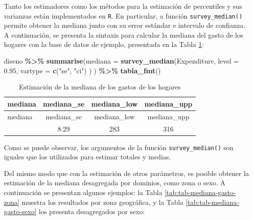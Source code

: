 \documentclass[
  spanish,
  12pt,
]{book}
\newenvironment{Shaded}{\begin{snugshade}}{\end{snugshade}}
\newcommand{\AttributeTok}[1]{\textcolor[rgb]{0.13,0.29,0.53}{#1}}
\newcommand{\FloatTok}[1]{\textcolor[rgb]{0.00,0.00,0.81}{#1}}
\newcommand{\FunctionTok}[1]{\textcolor[rgb]{0.13,0.29,0.53}{\textbf{#1}}}
\newcommand{\NormalTok}[1]{#1}
\newcommand{\SpecialCharTok}[1]{\textcolor[rgb]{0.81,0.36,0.00}{\textbf{#1}}}
\newcommand{\StringTok}[1]{\textcolor[rgb]{0.31,0.60,0.02}{#1}}
\begin{document}
Tanto los estimadores como los métodos para la estimación de percentiles y sus varianzas están implementados en \texttt{R}. En particular, a función \texttt{survey\_median()} permite obtener la mediana junto con su error estándar e intervalo de confianza. A continuación, se presenta la sintaxis para calcular la mediana del gasto de los hogares con la base de datos de ejemplo, presentada en la Tabla \ref{tab:tab-mediana-gasto}:

\begin{Shaded}
\begin{Highlighting}[]
\NormalTok{diseno }\SpecialCharTok{\%\textgreater{}\%} 
  \FunctionTok{summarise}\NormalTok{(}\AttributeTok{mediana =} \FunctionTok{survey\_median}\NormalTok{(Expenditure,}
                                    \AttributeTok{level =} \FloatTok{0.95}\NormalTok{,}
                                    \AttributeTok{vartype =}  \FunctionTok{c}\NormalTok{(}\StringTok{"se"}\NormalTok{, }\StringTok{"ci"}\NormalTok{)}
\NormalTok{                                    )}
\NormalTok{            ) }\SpecialCharTok{\%\textgreater{}\%}
  \FunctionTok{tabla\_fmt}\NormalTok{()}
\end{Highlighting}
\end{Shaded}

\begin{longtable}[]{@{}lccc@{}}
\caption{\label{tab:tab-mediana-gasto}Estimación de la mediana de los gastos de los hogares}\tabularnewline
\toprule\noalign{}
mediana & mediana\_se & mediana\_low & mediana\_upp \\
\midrule\noalign{}
\endfirsthead
\toprule\noalign{}
mediana & mediana\_se & mediana\_low & mediana\_upp \\
\midrule\noalign{}
\endhead
\bottomrule\noalign{}
\endlastfoot
298 & 8.29 & 283 & 316 \\
\end{longtable}

Como se puede observar, los argumentos de la función \texttt{survey\_median()} son iguales que los utilizados para estimar totales y medias.

Del mismo modo que con la estimación de otros parámetros, es posible obtener la estimación de la mediana desagregada por dominios, como zona o sexo. A continuación se presentan algunos ejemplos: la Tabla \ref{tab:tab-mediana-gasto-zona} muestra los resultados por zona geográfica, y la Tabla \ref{tab:tab-mediana-gasto-sexo} los presenta desagregados por sexo:
\end{document}
